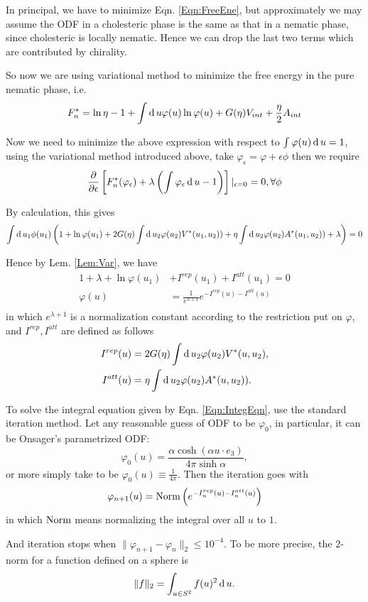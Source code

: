 In principal, we have to minimize Eqn. \ref{Eqn:FreeEne}, but approximately we may assume the ODF in a cholesteric phase is the same as that in a nematic phase, since cholesteric is locally nematic. Hence we can drop the last two terms which are contributed by chirality.

So now we are using variational method to minimize the free energy in the pure nematic phase, i.e.
\begin{equation}
	F_{n}^*=\ln\eta -1+\int\operatorname{d}u\varphi(u)\ln \varphi(u)+G(\eta)V_{int}+\frac{\eta}{2}A_{int}
\end{equation}

Now we need to minimize the above expression with respect to $\int\varphi(u)\operatorname{d}u=1$, using the variational method introduced above, take $\varphi_{\epsilon}=\varphi+\epsilon\phi$ then we require
\begin{equation}
	\frac{\partial}{\partial\epsilon}\left[F_{n}^*(\varphi_{\epsilon})+\lambda\left(\int \varphi_{\epsilon}\operatorname{d}u-1\right)\right]|_{\epsilon=0}=0, \forall \phi
\end{equation}

By calculation, this gives
\begin{equation}
	\int\operatorname{d}u_1\phi(u_1)\left(1+\ln \varphi(u_1)+2G(\eta)\int\operatorname{d}u_2\varphi(u_2)V^*(u_1,u_2))+\eta\int\operatorname{d}u_2\varphi(u_2)A^*(u_1,u_2))+\lambda\right)=0
\end{equation}

Hence by Lem. \ref{Lem:Var}, we have
\begin{equation}\label{Eqn:IntegEqn}
	\begin{split}
		1+\lambda+\ln \varphi(u_1)&+I^{rep}(u_1)+I^{att}(u_1)=0\\
		\varphi(u)&=\frac{1}{e^{\lambda+1}}e^{-I^{rep}(u)-I^{att}(u)}\\
	\end{split}
\end{equation}
in which $e^{\lambda+1}$ is a normalization constant according to the restriction put on $\varphi$, and $I^{rep}, I^{att}$ are defined as follows
\begin{equation}
	\begin{split}
		I^{rep}(u)&=2G(\eta)\int\operatorname{d}u_2\varphi(u_2)V^*(u,u_2),\\
		I^{att}(u)&=\eta\int\operatorname{d}u_2\varphi(u_2)A^*(u,u_2)).
	\end{split}
\end{equation}

To solve the integral equation given by Eqn. \ref{Eqn:IntegEqn}, use the standard iteration method. Let any reasonable guess of ODF to be $\varphi_0$, in particular, it can be Onsager's parametrized ODF:
\begin{equation}
	\varphi_0(u) = \frac{\alpha\cosh(\alpha u\cdot e_3)}{4\pi\sinh\alpha},
\end{equation}
or more simply take to be $\varphi_0(u)\equiv\frac{1}{4\pi}$. Then the iteration goes with
\begin{equation}
	\varphi_{n+1}(u)=\operatorname{Norm}\left(e^{-I_n^{rep}(u)-I_n^{att}(u)}\right)
\end{equation}
in which $\operatorname{Norm}$ means normalizing the integral over all $u$ to $1$.

And iteration stops when $\|\varphi_{n+1}-\varphi_n\|_2\leq 10^{-4}$. To be more precise, the $2$-norm for a function defined on a sphere is
\begin{equation}
	\|f\|_2=\int_{u\in S^2}f(u)^2\operatorname{d}u.
\end{equation}



